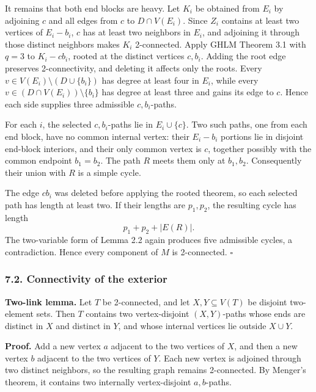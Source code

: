 \documentclass[
  11pt]{article}
\let\papersubsection\subsubsection
\renewcommand{\subsubsection}{\Needspace{7\baselineskip}\papersubsection}
\begin{document}
It remains that both end blocks are heavy. Let \(K_i\) be obtained from
\(E_i\) by adjoining \(c\) and all edges from \(c\) to \(D\cap V(E_i)\).
Since \(Z_i\) contains at least two vertices of \(E_i-b_i\), \(c\) has
at least two neighbors in \(E_i\), and adjoining it through those
distinct neighbors makes \(K_i\) 2-connected. Apply GHLM Theorem 3.1
with \(q=3\) to \(K_i-cb_i\), rooted at the distinct vertices \(c,b_i\).
Adding the root edge preserves 2-connectivity, and deleting it affects
only the roots. Every \(v\in V(E_i)\setminus(D\cup\{b_i\})\) has degree
at least four in \(E_i\), while every
\(v\in(D\cap V(E_i))\setminus\{b_i\}\) has degree at least three and
gains its edge to \(c\). Hence each side supplies three admissible
\(c,b_i\)-paths.

For each \(i\), the selected \(c,b_i\)-paths lie in \(E_i\cup\{c\}\).
Two such paths, one from each end block, have no common internal vertex:
their \(E_i-b_i\) portions lie in disjoint end-block interiors, and
their only common vertex is \(c\), together possibly with the common
endpoint \(b_1=b_2\). The path \(R\) meets them only at \(b_1,b_2\).
Consequently their union with \(R\) is a simple cycle.

The edge \(cb_i\) was deleted before applying the rooted theorem, so
each selected path has length at least two. If their lengths are
\(p_1,p_2\), the resulting cycle has length \[
 p_1+p_2+|E(R)|.
\] The two-variable form of Lemma 2.2 again produces five admissible
cycles, a contradiction. Hence every component of \(M\) is 2-connected.
\(\square\)


\subsubsection{7.2. Connectivity of the
exterior}\label{connectivity-of-the-exterior}

\textbf{Two-link lemma.} Let \(T\) be 2-connected, and let
\(X,Y\subseteq V(T)\) be disjoint two-element sets. Then \(T\) contains
two vertex-disjoint \((X,Y)\)-paths whose ends are distinct in \(X\) and
distinct in \(Y\), and whose internal vertices lie outside \(X\cup Y\).

\textbf{Proof.} Add a new vertex \(a\) adjacent to the two vertices of
\(X\), and then a new vertex \(b\) adjacent to the two vertices of
\(Y\). Each new vertex is adjoined through two distinct neighbors, so
the resulting graph remains 2-connected. By Menger's theorem, it
contains two internally vertex-disjoint \(a,b\)-paths.
\end{document}

